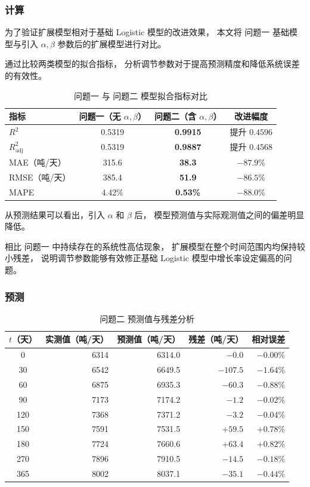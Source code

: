 \documentclass[12pt,a4paper]{ctexart}
\begin{document}
\subsubsection{计算}

为了验证扩展模型相对于基础 Logistic 模型的改进效果，
本文将 问题一 基础模型与引入 $\alpha,\beta$ 参数后的扩展模型进行对比。

通过比较两类模型的拟合指标，
分析调节参数对于提高预测精度和降低系统误差的有效性。

\begin{table}[htbp]
\centering
\caption{问题一 与 问题二 模型拟合指标对比}
\label{tab:q1_q2_comparison}
\begin{tabular}{lccc}
\toprule
指标 & 问题一（无 $\alpha,\beta$） & 问题二（含 $\alpha,\beta$） & 改进幅度 \\
\midrule
$R^2$         & 0.5319  & \textbf{0.9915} & 提升 $0.4596$ \\
$R_{\text{adj}}^2$ & 0.5319  & \textbf{0.9887} & 提升 $0.4568$ \\
MAE（吨/天）  & 315.6   & \textbf{38.3}   & $-87.9\%$ \\
RMSE（吨/天） & 385.4   & \textbf{51.9}   & $-86.5\%$ \\
MAPE         & 4.42\%  & \textbf{0.53\%}  & $-88.0\%$ \\
\bottomrule
\end{tabular}
\end{table}

从预测结果可以看出，引入 $\alpha$ 和 $\beta$ 后，
模型预测值与实际观测值之间的偏差明显降低。

相比 问题一 中持续存在的系统性高估现象，
扩展模型在整个时间范围内均保持较小残差，
说明调节参数能够有效修正基础 Logistic 模型中增长率设定偏高的问题。

\subsubsection{预测}

\begin{table}[htbp]
\centering
\caption{问题二 预测值与残差分析}
\label{tab:q2_predictions}
\begin{tabular}{crrrr}
\toprule
$t$（天） & 实测值（吨/天） & 预测值（吨/天） & 残差（吨/天） & 相对误差 \\
\midrule
0   & 6314 & 6314.0 & $-0.0$    & $-0.00\%$ \\
30  & 6542 & 6649.5 & $-107.5$  & $-1.64\%$ \\
60  & 6875 & 6935.3 & $-60.3$   & $-0.88\%$ \\
90  & 7173 & 7174.2 & $-1.2$    & $-0.02\%$ \\
120 & 7368 & 7371.2 & $-3.2$    & $-0.04\%$ \\
150 & 7591 & 7531.5 & $+59.5$   & $+0.78\%$ \\
180 & 7724 & 7660.6 & $+63.4$   & $+0.82\%$ \\
270 & 7896 & 7910.5 & $-14.5$   & $-0.18\%$ \\
365 & 8002 & 8037.1 & $-35.1$   & $-0.44\%$ \\
\bottomrule
\end{tabular}
\end{table}
\end{document}

